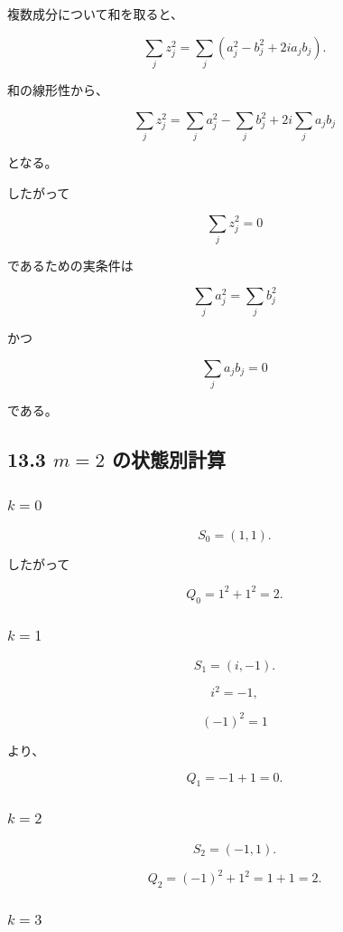 \documentclass[
  a4paper,
]{ltjsarticle}
\begin{document}
複数成分について和を取ると、

\[
\sum_j z_j^2
=
\sum_j(a_j^2-b_j^2+2i a_jb_j).
\]

和の線形性から、

\[
\boxed{
\sum_j z_j^2
=
\sum_j a_j^2
-
\sum_j b_j^2
+
2i\sum_j a_jb_j
}
\]

となる。

したがって

\[
\sum_j z_j^2=0
\]

であるための実条件は

\[
\sum_j a_j^2
=
\sum_j b_j^2
\]

かつ

\[
\sum_j a_jb_j
=
0
\]

である。

\subsection{\texorpdfstring{13.3 \(m=2\)
の状態別計算}{13.3 m=2 の状態別計算}}\label{m2-ux306eux72b6ux614bux5225ux8a08ux7b97}

\subsubsection{\texorpdfstring{\(k=0\)}{k=0}}\label{k0-2}

\[
S_0=(1,1).
\]

したがって

\[
Q_0
=
1^2+1^2
=
2.
\]

\subsubsection{\texorpdfstring{\(k=1\)}{k=1}}\label{k1-2}

\[
S_1=(i,-1).
\]

\[
i^2=-1,
\]

\[
(-1)^2=1
\]

より、

\[
Q_1
=
-1+1
=
0.
\]

\subsubsection{\texorpdfstring{\(k=2\)}{k=2}}\label{k2-2}

\[
S_2=(-1,1).
\]

\[
Q_2
=
(-1)^2+1^2
=
1+1
=
2.
\]

\subsubsection{\texorpdfstring{\(k=3\)}{k=3}}\label{k3-2}
\end{document}
